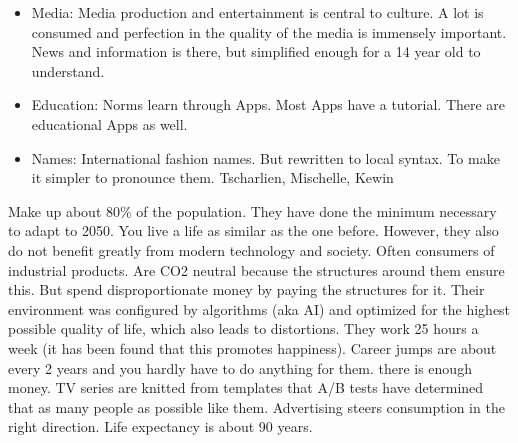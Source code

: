 \begin{itemize}
    \item Media: Media production and entertainment is central to culture. A lot is consumed and perfection in the quality of the media is immensely important. News and information is there, but simplified enough for a 14 year old to understand.
    \item Education: Norms learn through Apps. Most Apps have a tutorial. There are educational Apps as well.
    \item Names: International fashion names. But rewritten to local syntax. To make it simpler to pronounce them. Tscharlien, Mischelle, Kewin
\end{itemize}

Make up about 80\% of the population. They have done the minimum necessary to adapt to 2050. You live  a life as similar as the one before. However, they also do not benefit greatly from modern technology and society. Often consumers of industrial products. Are CO2 neutral because the structures around them ensure this. But spend disproportionate money by paying the structures for it. Their environment was configured by algorithms (aka AI) and optimized for the highest possible quality of life, which also leads to distortions. They work 25 hours a week (it has been found that this promotes happiness). Career jumps are about every 2 years and you hardly have to do anything for them. there is enough money. TV series are knitted from templates that A/B tests have determined that as many people as possible like them. Advertising steers consumption in the right direction. Life expectancy is about 90 years.



